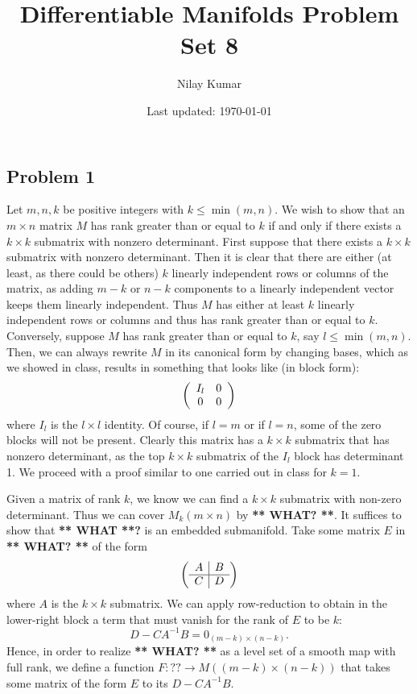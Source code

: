 \documentclass{../../mathnotes}
\title{Differentiable Manifolds Problem Set 8}
\author{Nilay Kumar}
\date{Last updated: \today}
\begin{document}
\maketitle

\subsection*{Problem 1}

Let $m,n,k$ be positive integers with $k\leq\min(m,n)$. We wish to show that an $m\times n$ matrix $M$ has rank greater
than or equal to $k$ if and only if there exists a $k\times k$ submatrix with nonzero determinant.
First suppose that there exists a $k\times k$ submatrix with nonzero determinant. Then it is clear that
there are either (at least, as there could be others) $k$ linearly independent rows or columns of the matrix, as adding $m-k$ or $n-k$ components
to a linearly independent vector keeps them linearly independent. Thus $M$ has either at least $k$ linearly independent rows
or columns and thus has rank greater than or equal to $k$.
Conversely, suppose $M$ has rank greater than or equal to $k$, say $l\leq \min(m,n)$. Then, we can always rewrite $M$ in its canonical form
by changing bases, which as we showed in class, results in something that looks like (in block form):
\begin{align*}
    \left(\begin{array}[]{cc}
        I_l & 0 \\
        0 & 0
    \end{array}\right)
\end{align*}
where $I_l$ is the $l\times l$ identity. Of course, if $l=m$ or if $l=n$, some of the zero blocks will not be present.
Clearly this matrix has a $k\times k$ submatrix that has nonzero determinant, as the top $k\times k$ submatrix of the
$I_l$ block has determinant 1. We proceed with a proof similar to one carried out in class for $k=1$.

Given a matrix of rank $k$, we know we can find a $k\times k$ submatrix with non-zero determinant.
Thus we can cover $M_k(m\times n)$ by \textbf{** WHAT? **}. It suffices to show that \textbf{** WHAT **?}
is an embedded submanifold. Take some matrix $E$ in \textbf{** WHAT? **} of the form
\begin{align*}
    \left(\begin{array}[]{c|c}
        A & B \\ \hline
        C & D
    \end{array}\right)
\end{align*}
where $A$ is the $k\times k$ submatrix. We can apply row-reduction to obtain in the lower-right block a
term that must vanish for the rank of $E$ to be $k$:
\[D-CA^{-1}B=0_{(m-k)\times(n-k)}.\]
Hence, in order to realize \textbf{** WHAT? **} as a level set of a smooth map with full rank, we define
a function $F:??\to M( (m-k)\times(n-k))$ that takes some matrix of the form $E$ to its $D-CA^{-1}B$.
\end{document}
